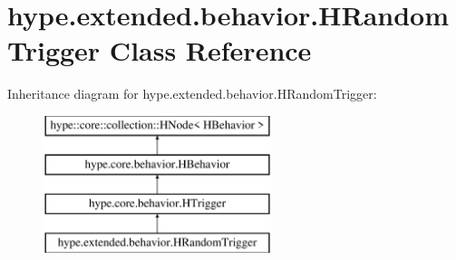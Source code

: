 \hypertarget{classhype_1_1extended_1_1behavior_1_1_h_random_trigger}{\section{hype.\-extended.\-behavior.\-H\-Random\-Trigger Class Reference}
\label{classhype_1_1extended_1_1behavior_1_1_h_random_trigger}
}
Inheritance diagram for hype.\-extended.\-behavior.\-H\-Random\-Trigger\-:\begin{figure}[H]
\begin{center}
\leavevmode
\includegraphics[height=4.000000cm]{classhype_1_1extended_1_1behavior_1_1_h_random_trigger}
\end{center}
\end{figure}
